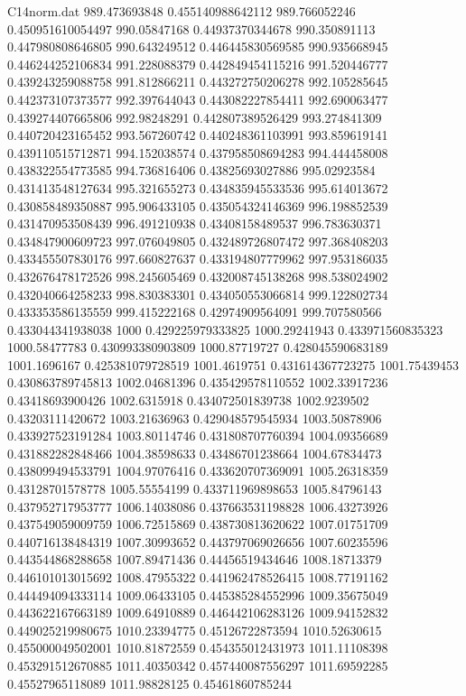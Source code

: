\begin{filecontents}{C14norm.dat}
989.473693848			0.455140988642112
989.766052246			0.450951610054497
990.05847168			0.44937370344678
990.350891113			0.447980808646805
990.643249512			0.446445830569585
990.935668945			0.446244252106834
991.228088379			0.442849454115216
991.520446777			0.439243259088758
991.812866211			0.443272750206278
992.105285645			0.442373107373577
992.397644043			0.443082227854411
992.690063477			0.439274407665806
992.98248291			0.442807389526429
993.274841309			0.440720423165452
993.567260742			0.440248361103991
993.859619141			0.439110515712871
994.152038574			0.437958508694283
994.444458008			0.438322554773585
994.736816406			0.43825693027886
995.02923584			0.431413548127634
995.321655273			0.434835945533536
995.614013672			0.430858489350887
995.906433105			0.435054324146369
996.198852539			0.431470953508439
996.491210938			0.43408158489537
996.783630371			0.434847900609723
997.076049805			0.432489726807472
997.368408203			0.433455507830176
997.660827637			0.433194807779962
997.953186035			0.432676478172526
998.245605469			0.432008745138268
998.538024902			0.432040664258233
998.830383301			0.434050553066814
999.122802734			0.433353586135559
999.415222168			0.42974909564091
999.707580566			0.433044341938038
1000			0.429225979333825
1000.29241943			0.433971560835323
1000.58477783			0.430993380903809
1000.87719727			0.428045590683189
1001.1696167			0.425381079728519
1001.4619751			0.431614367723275
1001.75439453			0.430863789745813
1002.04681396			0.435429578110552
1002.33917236			0.43418693900426
1002.6315918			0.434072501839738
1002.9239502			0.43203111420672
1003.21636963			0.429048579545934
1003.50878906			0.433927523191284
1003.80114746			0.431808707760394
1004.09356689			0.431882282848466
1004.38598633			0.43486701238664
1004.67834473			0.438099494533791
1004.97076416			0.433620707369091
1005.26318359			0.43128701578778
1005.55554199			0.433711969898653
1005.84796143			0.437952717953777
1006.14038086			0.437663531198828
1006.43273926			0.437549059009759
1006.72515869			0.438730813620622
1007.01751709			0.440716138484319
1007.30993652			0.443797069026656
1007.60235596			0.443544868288658
1007.89471436			0.44456519434646
1008.18713379			0.446101013015692
1008.47955322			0.441962478526415
1008.77191162			0.444494094333114
1009.06433105			0.445385284552996
1009.35675049			0.443622167663189
1009.64910889			0.446442106283126
1009.94152832			0.449025219980675
1010.23394775			0.45126722873594
1010.52630615			0.455000049502001
1010.81872559			0.454355012431973
1011.11108398			0.453291512670885
1011.40350342			0.457440087556297
1011.69592285			0.45527965118089
1011.98828125			0.45461860785244

\end{filecontents}
